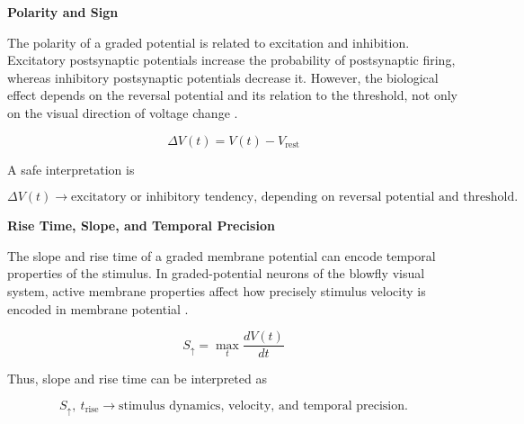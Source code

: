 \documentclass{book}
\providecommand{\ProjectDeepHeading}[2]{%
    \par\medskip\noindent\textbf{#2}\par\smallskip
}
\begin{document}
        \ProjectDeepHeading{12}{Polarity and Sign}
            
            The polarity of a graded potential is related to excitation and inhibition. Excitatory postsynaptic potentials increase the probability of postsynaptic firing, whereas inhibitory postsynaptic potentials decrease it. However, the biological effect depends on the reversal potential and its relation to the threshold, not only on the visual direction of voltage change \citep{purves-2001-excitatory-and-inhibitory-postsynaptic-potentials,purves-2001-summation-of-synaptic-potentials}.
            
            \begin{equation}
                \ensuremath{\Delta} V(t)
                =
                V(t)-V_{\mathrm{rest}}
            \end{equation}
            
            A safe interpretation is
            
            \begin{equation}
                \ensuremath{\Delta} V(t)
                \rightarrow
                \text{excitatory or inhibitory tendency, depending on reversal potential and threshold}.
            \end{equation}
        
        \ProjectDeepHeading{12}{Rise Time, Slope, and Temporal Precision}
            
            The slope and rise time of a graded membrane potential can encode temporal properties of the stimulus. In graded-potential neurons of the blowfly visual system, active membrane properties affect how precisely stimulus velocity is encoded in membrane potential \citep{haag-1998-active-membrane-properties-and-signal-encoding-in-graded-potential-neurons}.
            
            \begin{equation}
                S_{\uparrow}
                =
                \max_t \frac{dV(t)}{dt}
            \end{equation}
            
            Thus, slope and rise time can be interpreted as
            
            \begin{equation}
                S_{\uparrow},\ t_{\mathrm{rise}}
                \rightarrow
                \text{stimulus dynamics, velocity, and temporal precision}.
            \end{equation}
        
\end{document}
